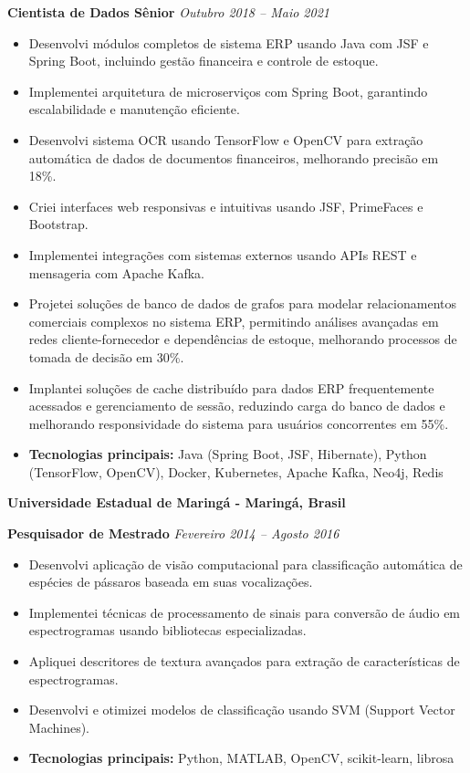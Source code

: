 \documentclass[12pt,a4paper,sans]{moderncv}
\begin{document}
\textbf{Cientista de Dados Sênior} \hfill \textit{Outubro 2018 -- Maio 2021}
\begin{itemize}
    \item Desenvolvi módulos completos de sistema ERP usando Java com JSF e Spring Boot, incluindo gestão financeira e controle de estoque.
    \item Implementei arquitetura de microserviços com Spring Boot, garantindo escalabilidade e manutenção eficiente.
    \item Desenvolvi sistema OCR usando TensorFlow e OpenCV para extração automática de dados de documentos financeiros, melhorando precisão em 18\%.
    \item Criei interfaces web responsivas e intuitivas usando JSF, PrimeFaces e Bootstrap.
    \item Implementei integrações com sistemas externos usando APIs REST e mensageria com Apache Kafka.
    \item Projetei soluções de banco de dados de grafos para modelar relacionamentos comerciais complexos no sistema ERP, permitindo análises avançadas em redes cliente-fornecedor e dependências de estoque, melhorando processos de tomada de decisão em 30\%.
    \item Implantei soluções de cache distribuído para dados ERP frequentemente acessados e gerenciamento de sessão, reduzindo carga do banco de dados e melhorando responsividade do sistema para usuários concorrentes em 55\%.
    \item \textbf{Tecnologias principais:} Java (Spring Boot, JSF, Hibernate), Python (TensorFlow, OpenCV), Docker, Kubernetes, Apache Kafka, Neo4j, Redis
\end{itemize}

\vspace{24pt}
\small{\textbf{Universidade Estadual de Maringá - Maringá, Brasil}}
\vspace{3pt}

\textbf{Pesquisador de Mestrado} \hfill \textit{Fevereiro 2014 -- Agosto 2016}
\begin{itemize}
    \item Desenvolvi aplicação de visão computacional para classificação automática de espécies de pássaros baseada em suas vocalizações.
    \item Implementei técnicas de processamento de sinais para conversão de áudio em espectrogramas usando bibliotecas especializadas.
    \item Apliquei descritores de textura avançados para extração de características de espectrogramas.
    \item Desenvolvi e otimizei modelos de classificação usando SVM (Support Vector Machines).
    \item \textbf{Tecnologias principais:} Python, MATLAB, OpenCV, scikit-learn, librosa
\end{itemize}
\end{document}

